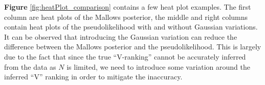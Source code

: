 \documentclass[11pt, oneside]{article}   	%
\begin{document}
\textbf{Figure} \ref{fig:heatPlot_comparison} contains a few heat plot examples. The first column are heat plots of the Mallows posterior, the middle and right columns contain heat plots of the pseudolikelihood with and without Gaussian variations. It can be observed that introducing the Gaussian variation can reduce the difference between the Mallows posterior and the pseudolikelihood. This is largely due to the fact that since the true ``V-ranking'' cannot be accurately inferred from the data as $N$ is limited, we need to introduce some variation around the inferred ``V'' ranking in order to mitigate the inaccuracy.

\begin{figure}[h!]
\end{figure}
\end{document}
